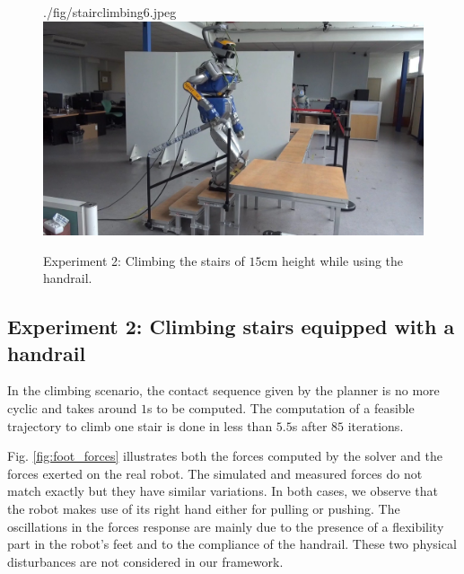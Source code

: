 \begin{figure}[!ht]
\begin{center}
    {./fig/stairclimbing6.jpeg}
  \includegraphics[trim={7.0cm 0.0cm 20.0cm 0.0cm}, clip, width=0.2\widthValue]
    {./fig/stairclimbing7.jpeg}
  \caption{
   Experiment 2: Climbing the stairs of $15$cm height while using the handrail.
  }
  \label{fig:moviepicture2}
  \end{center}
\end{figure}

\subsection{Experiment 2: Climbing stairs equipped with a handrail}

In the climbing scenario, the contact sequence given by the planner is no more cyclic and takes around $1$s to be computed. The computation of a feasible trajectory to climb one stair is done in less than $5.5$s after $85$ iterations. 

Fig. \ref{fig:foot_forces} illustrates both the forces computed by the solver and the forces exerted on the real robot. The simulated and measured forces do not match exactly but they have similar variations. In both cases, we observe that the robot makes use of its right hand either for pulling or pushing. The oscillations in the forces response are mainly due to the presence of a flexibility part in the robot's feet and to the compliance of the handrail. These two physical disturbances are not considered in our framework.

